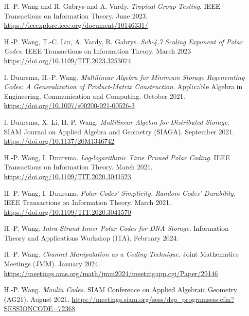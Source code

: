 \documentclass{article}
\def\sec#1{\vskip1em\textbf{\fs1#1}}
\def\fs#1{%
        \pgfmathsetmacro\a{#1}%
        \pgfmathsetmacro\A{\parskip*(4/3)^\a}%
        \pgfmathsetmacro\B{\A*(4/3)}%
        \fontsize{\A pt}{\B pt}\selectfont%
    }
\def\newtoold{\mdseries (new to old)}
\begin{document}
\bgroup
\def\section#1#2{\sec{Journal Publications \newtoold}}
\begin{thebibliography}{J9}
    H.-P. Wang and R. Gabrys and A. Vardy.
    \emph{Tropical Group Testing}.
    IEEE Transactions on Information Theory.
    June 2023.
    \url{https://ieeexplore.ieee.org/document/10146331/}

    H.-P. Wang, T.-C. Lin, A. Vardy, R. Gabrys.
    \emph{Sub-4.7 Scaling Exponent of Polar Codes}.
    IEEE Transactions on Information Theory.
    March 2023
    \url{https://doi.org/10.1109/TIT.2023.3253074}

    I. Duursma, H.-P. Wang.
    \emph{Multilinear Algebra for Minimum Storage Regenerating Codes:
        A Generalization of Product-Matrix Construction}.
    Applicable Algebra in Engineering, Communication and Computing.
    October 2021.
    \url{https://doi.org/10.1007/s00200-021-00526-3}

    I. Duursma, X. Li, H.-P. Wang.
    \emph{Multilinear Algebra for Distributed Storage}.
    SIAM Journal on Applied Algebra and Geometry (SIAGA).
    September 2021.
    \url{https://doi.org/10.1137/20M1346742}

    H.-P. Wang, I. Duursma.
    \emph{Log-logarithmic Time Pruned Polar Coding}.
    IEEE Transactions on Information Theory.
    March 2021.
    \url{https://doi.org/10.1109/TIT.2020.3041523}

    H.-P. Wang, I. Duursma.
    \emph{Polar Codes' Simplicity, Random Codes' Durability}.
    IEEE Transactions on Information Theory.
    March 2021.
    \url{https://doi.org/10.1109/TIT.2020.3041570}
\end{thebibliography}
\egroup

\bgroup
\def\section#1#2{\sec{Invited Talks \newtoold}}
\begin{thebibliography}{T9}
    H.-P. Wang.
    \emph{Intra-Strand Inner Polar Codes for DNA Storage}.
    Information Theory and Applications Workshop (ITA).
    February 2024.

    H.-P. Wang.
    \emph{Channel Manipulation as a Coding Technique}.
    Joint Mathematics Meetings (JMM).
    January 2024.
    \url{https://meetings.ams.org/math/jmm2024/meetingapp.cgi/Paper/29146}

    H.-P. Wang.
    \emph{Moulin Codes}.
    SIAM Conference on Applied Algebraic Geometry (AG21).
    August 2021.
    \url{https://meetings.siam.org/sess/dsp_programsess.cfm?SESSIONCODE=72368}
\end{thebibliography}
\egroup
\end{document}
